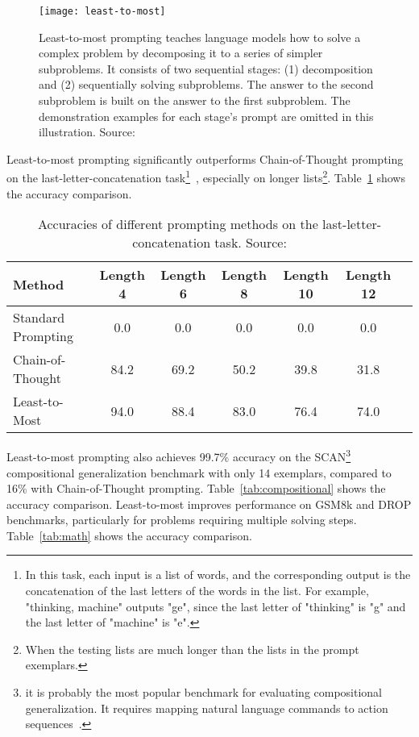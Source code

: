 \begin{figure}[ht]
	\centering
	\texttt{[image: least-to-most]}
	\caption{Least-to-most prompting teaches language models how to solve a complex problem by decomposing it to a series of simpler subproblems. It consists of two sequential stages: (1) decomposition and (2) sequentially solving subproblems. The answer to the second subproblem is built on the answer to the first subproblem. The demonstration examples for each stage’s prompt are omitted in this illustration. Source: \textcite{zhou2022least}}
	\label{fig:least-to-most}
\end{figure}

Least-to-most prompting significantly outperforms Chain-of-Thought prompting on the last-letter-concatenation task\footnote{In this task, each input is a list of words, and the corresponding output is the concatenation of the last letters of the words in the list. For example, "thinking, machine" outputs "ge", since the last letter of "thinking" is "g" and the last letter of "machine" is "e".}~\cite{wei2022chain}, especially on longer lists\footnote{When the testing lists are much longer than the lists in the prompt exemplars.}.
Table~\ref{tab:symbolic} shows the accuracy comparison.

\begin{table}[h!]
	\centering
	\begin{tabularx}{\textwidth}{Xcccccc}
		\hline
		\textbf{Method}    & \textbf{Length 4} & \textbf{Length 6} & \textbf{Length 8} & \textbf{Length 10} & \textbf{Length 12} \\
		\hline
		Standard Prompting & 0.0               & 0.0               & 0.0               & 0.0                & 0.0                \\
		Chain-of-Thought   & 84.2              & 69.2              & 50.2              & 39.8               & 31.8               \\
		Least-to-Most      & 94.0              & 88.4              & 83.0              & 76.4               & 74.0               \\
		\hline
	\end{tabularx}
	\caption{Accuracies of different prompting methods on the last-letter-concatenation task. Source: \textcite{zhou2022least}}
	\label{tab:symbolic}
\end{table}

Least-to-most prompting also achieves 99.7\% accuracy on the SCAN\footnote{it is probably the most popular benchmark for evaluating compositional generalization. It requires mapping natural language commands to action sequences~\cite{lake2018generalization}.} compositional generalization benchmark with only 14 exemplars, compared to 16\% with Chain-of-Thought prompting.
Table~\ref{tab:compositional} shows the accuracy comparison.
Least-to-most improves performance on GSM8k and DROP benchmarks, particularly for problems requiring multiple solving steps.
Table~\ref{tab:math} shows the accuracy comparison.


